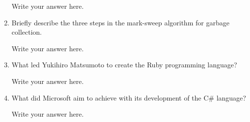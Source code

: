 \begin{enumerate}
\begin{answer}
    Write your answer here.

    \end{answer}

  \item Briefly describe the three steps in the mark-sweep algorithm
    for garbage collection.

  \begin{answer}

    Write your answer here.

    \end{answer}

  \item What led Yukihiro Matsumoto to create the Ruby programming language?

  \begin{answer}

    Write your answer here.

    \end{answer}

  \item What did Microsoft aim to achieve with its development of the
    C\# language?

  \begin{answer}

    Write your answer here.

    \end{answer}

  \end{enumerate}
